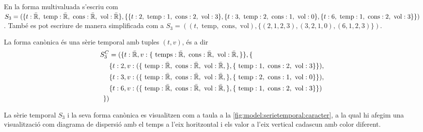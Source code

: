 En la forma multivaluada s'escriu com %
$S_3 = ( \{t: \bar{\R{}}, \text{ temp}: \bar{\R{}}, \text{
  cons}: \bar{\R{}},\text{ vol}: \bar{\R{}} \}, %
\{%
\{t:2,\text{ temp}:1 , \text{ cons}:2,\text{ vol}:3 \}, %
\{t:3,\text{ temp}:2 , \text{ cons}:1,\text{ vol}:0 \}, %
\{t:6,\text{ temp}:1 , \text{ cons}:2,\text{ vol}:3 \} %
\} )$. També es pot escriure de manera simplificada com a $S_{3} = (
(t,\text{ temp},\text{ cons},\text{ vol}),\{ (2,1,2,3), (3,2,1,0),
(6,1,2,3) \})$.

La forma canònica és una sèrie temporal amb tuples $(t,v)$, és a dir
\begin{align*}
  S^C_{3} &= ( \{t: \bar{\mathbb{R}{}}, v: \{ \text{ temps}:
  \bar{\mathbb{R}{}}, \text{ cons}: \bar{\mathbb{R}{}},\text{ vol}:
  \bar{\mathbb{R}{}},\} \}, \{ \\
  & \{t:2, v: ( \{ \text{ temp}: \bar{\mathbb{R}{}}, \text{ cons}:
  \bar{\mathbb{R}{}},\text{ vol}: \bar{\mathbb{R}{}},\}, \{ \text{ temp}:1
  ,  \text{ cons}:2,\text{ vol}:3 \}\} ), \\
 & \{t:3, v: ( \{ \text{ temp}: \bar{\mathbb{R}{}}, \text{ cons}:
  \bar{\mathbb{R}{}},\text{ vol}: \bar{\mathbb{R}{}},\}, \{ \text{ temp}:2
  ,  \text{ cons}:1,\text{ vol}:0 \}\} ), \\
 & \{t:6, v: ( \{ \text{ temp}: \bar{\mathbb{R}{}}, \text{ cons}:
  \bar{\mathbb{R}{}},\text{ vol}: \bar{\mathbb{R}{}},\}, \{ \text{ temp}:1
  ,  \text{ cons}:2,\text{ vol}:3 \}\} ) \\
  \} )
\end{align*}


La sèrie temporal $S_3$ i la seva forma canònica es visualitzen com a
taula a la \autoref{fig:model:serietemporal:caracter}, a la qual hi
afegim una visualització com diagrama de dispersió amb el temps a
l'eix horitzontal i els valor a l'eix vertical cadascun amb color
diferent.


